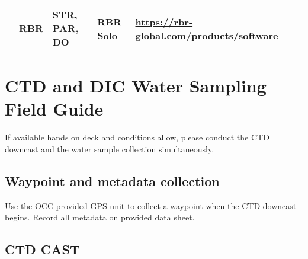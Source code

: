 \documentclass[]{book}
\begin{document}
\begin{longtable}[]{@{}llllll@{}}
\begin{minipage}[t]{0.06\columnwidth}
\strut
\end{minipage} & \begin{minipage}[t]{0.07\columnwidth}\raggedright\strut
RBR\strut
\end{minipage} & \begin{minipage}[t]{0.18\columnwidth}\raggedright\strut
STR, PAR, DO\strut
\end{minipage} & \begin{minipage}[t]{0.08\columnwidth}\raggedright\strut
RBR Solo\strut
\end{minipage} & \begin{minipage}[t]{0.30\columnwidth}\raggedright\strut
\url{https://rbr-global.com/products/software}\strut
\end{minipage}\tabularnewline
\bottomrule
\end{longtable}

\chapter{CTD and DIC Water Sampling Field Guide}\label{water}

If available hands on deck and conditions allow, please conduct the CTD
downcast and the water sample collection simultaneously.

\section{Waypoint and metadata
collection}\label{waypoint-and-metadata-collection}

Use the OCC provided GPS unit to collect a waypoint when the CTD
downcast begins. Record all metadata on provided data sheet.

\section{CTD CAST}\label{ctd-cast}
\end{document}
